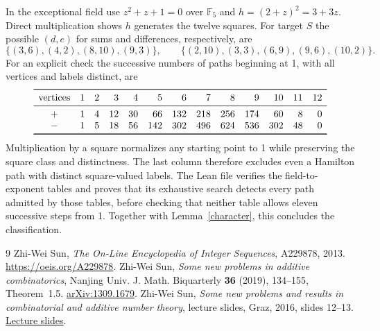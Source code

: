 \documentclass[11pt]{article}
\newcommand{\F}{\mathbb F}
\begin{document}
In the exceptional field use $z^2+z+1=0$ over $\F_5$ and $h=(2+z)^2=3+3z$. Direct multiplication shows $h$ generates the twelve squares. For target $S$ the possible $(d,e)$ for sums and differences, respectively, are
\[
 \{(3,6),(4,2),(8,10),(9,3)\},\qquad
 \{(2,10),(3,3),(6,9),(9,6),(10,2)\}.
\]
For an explicit check the successive numbers of paths beginning at 1, with all vertices and labels distinct, are
\[
\begin{array}{crrrrrrrrrrrr}
\toprule
\text{vertices}&1&2&3&4&5&6&7&8&9&10&11&12\\\midrule
+&1&4&12&30&66&132&218&256&174&60&8&0\\
-&1&5&18&56&142&302&496&624&536&302&48&0\\\bottomrule
\end{array}
\]
Multiplication by a square normalizes any starting point to 1 while preserving the square class and distinctness. The last column therefore excludes even a Hamilton path with distinct square-valued labels. The Lean file verifies the field-to-exponent tables and proves that its exhaustive search detects every path admitted by those tables, before checking that neither table allows eleven successive steps from 1. Together with Lemma~\ref{character}, this concludes the classification.

\small
\begin{thebibliography}{9}
 Zhi-Wei Sun, \emph{The On-Line Encyclopedia of Integer Sequences}, A229878, 2013. \url{https://oeis.org/A229878}.
 Zhi-Wei Sun, \emph{Some new problems in additive combinatorics}, Nanjing Univ. J. Math. Biquarterly \textbf{36} (2019), 134--155, Theorem~1.5. \href{https://arxiv.org/abs/1309.1679}{arXiv:1309.1679}.
 Zhi-Wei Sun, \emph{Some new problems and results in combinatorial and additive number theory}, lecture slides, Graz, 2016, slides 12--13. \href{https://static.uni-graz.at/fileadmin/veranstaltungen/additive2016/Talks/sun_zw_slides.pdf}{Lecture slides}.
\end{thebibliography}
\end{document}
